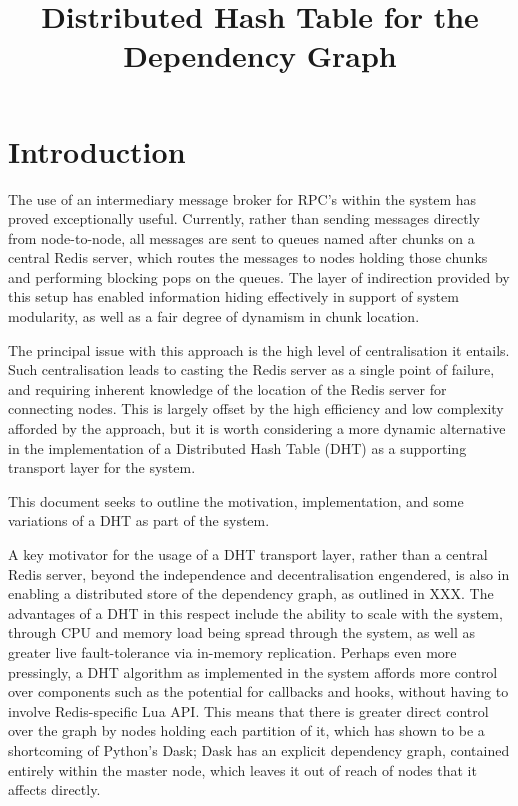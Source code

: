 \documentclass[10pt, a4paper]{article}
\begin{document}
\title{Distributed Hash Table for the Dependency Graph}
  
\maketitle

\section{Introduction}

The use of an intermediary message broker for RPC's within the system has proved exceptionally useful.
Currently, rather than sending messages directly from node-to-node, all messages are sent to queues named after chunks on a central Redis server, which routes the messages to nodes holding those chunks and performing blocking pops on the queues.
The layer of indirection provided by this setup has enabled information hiding effectively in support of system modularity, as well as a fair degree of dynamism in chunk location.

The principal issue with this approach is the high level of centralisation it entails.
Such centralisation leads to casting the Redis server as a single point of failure, and requiring inherent knowledge of the location of the Redis server for connecting nodes.
This is largely offset by the high efficiency and low complexity afforded by the approach, but it is worth considering a more dynamic alternative in the implementation of a Distributed Hash Table (DHT) as a supporting transport layer for the system.

This document seeks to outline the motivation, implementation, and some variations of a DHT as part of the \lsr{} system.

A key motivator for the usage of a DHT transport layer, rather than a central Redis server, beyond the independence and decentralisation engendered, is also in enabling a distributed store of the dependency graph, as outlined in XXX.
The advantages of a DHT in this respect include the ability to scale with the system, through CPU and memory load being spread through the system, as well as greater live fault-tolerance via in-memory replication.
Perhaps even more pressingly, a DHT algorithm as implemented in the system affords more control over components such as the potential for callbacks and hooks, without having to involve Redis-specific Lua API.
This means that there is greater direct control over the graph by nodes holding each partition of it, which has shown to be a shortcoming of Python's Dask; Dask has an explicit dependency graph, contained entirely within the master node, which leaves it out of reach of nodes that it affects directly.
\end{document}
